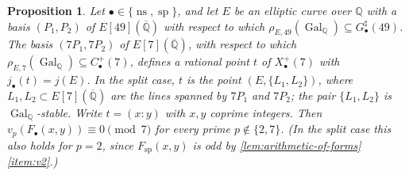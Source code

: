 \documentclass[12pt]{amsart}
\newcommand{\Q}{\mathbb{Q}}
\newcommand{\Qbar}{{\overline{\Q}}}
\DeclareMathOperator{\ns}{ns}
\DeclareMathOperator{\spc}{sp}
\DeclareMathOperator{\Gal}{Gal}
\numberwithin{equation}{section}
\newtheorem{proposition}[theorem]{Proposition}
\theoremstyle{definition}
\begin{document}
\begin{proposition}
  \label{prop:multiplicative-primes}
  Let $\bullet \in \{\ns,\spc\}$, and let $E$ be an elliptic curve over $\Q$ with a
  basis $(P_1, P_2)$ of $E[49](\Qbar)$ with respect to which
  $\rho_{E,49}(\Gal_{\Q}) \subseteq G_{\bullet}^{\sharp}(49)$. The basis
  $(7P_1, 7P_2)$ of $E[7](\Qbar)$, with respect to which
  $\rho_{E,7}(\Gal_{\Q}) \subseteq C_{\bullet}^{+}(7)$, defines a rational point
  $t$ of $X_{\bullet}^{+}(7)$ with $j_{\bullet}(t) = j(E)$. In the split case,
  $t$ is the point $(E, \{L_1,L_2\})$, where $L_1, L_2 \subset E[7](\Qbar)$ are
  the lines spanned by $7P_1$ and $7P_2$; the pair $\{L_1,L_2\}$ is
  $\Gal_{\Q}$-stable. Write $t = (x:y)$ with $x,y$ coprime integers. Then
  $v_p(F_{\bullet}(x,y)) \equiv 0 \pmod 7$ for every prime $p \notin \{2,7\}$. (In the split
  case this also holds for $p = 2$, since $F_{\spc}(x,y)$ is odd by
  \cref{lem:arithmetic-of-forms}\eqref{item:v2}.)
\end{proposition}
\end{document}
